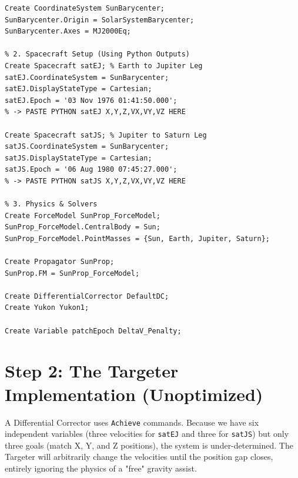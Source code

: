 \documentclass[11pt, letterpaper]{article}
\begin{document}
\begin{lstlisting}[caption=GMAT Resource Initialization]
% 1. Coordinate System
Create CoordinateSystem SunBarycenter;
SunBarycenter.Origin = SolarSystemBarycenter;
SunBarycenter.Axes = MJ2000Eq;

% 2. Spacecraft Setup (Using Python Outputs)
Create Spacecraft satEJ; % Earth to Jupiter Leg
satEJ.CoordinateSystem = SunBarycenter;
satEJ.DisplayStateType = Cartesian;
satEJ.Epoch = '03 Nov 1976 01:41:50.000';
% -> PASTE PYTHON satEJ X,Y,Z,VX,VY,VZ HERE

Create Spacecraft satJS; % Jupiter to Saturn Leg
satJS.CoordinateSystem = SunBarycenter;
satJS.DisplayStateType = Cartesian;
satJS.Epoch = '06 Aug 1980 07:45:27.000';
% -> PASTE PYTHON satJS X,Y,Z,VX,VY,VZ HERE

% 3. Physics & Solvers
Create ForceModel SunProp_ForceModel;
SunProp_ForceModel.CentralBody = Sun;
SunProp_ForceModel.PointMasses = {Sun, Earth, Jupiter, Saturn};

Create Propagator SunProp;
SunProp.FM = SunProp_ForceModel;

Create DifferentialCorrector DefaultDC;
Create Yukon Yukon1;

Create Variable patchEpoch DeltaV_Penalty;
\end{lstlisting}

\newpage
\section*{Step 2: The Targeter Implementation (Unoptimized)}

A Differential Corrector uses \texttt{Achieve} commands. Because we have six independent variables (three velocities for \texttt{satEJ} and three for \texttt{satJS}) but only three goals (match X, Y, and Z positions), the system is under-determined. The Targeter will arbitrarily change the velocities until the position gap closes, entirely ignoring the physics of a "free" gravity assist.
\end{document}
